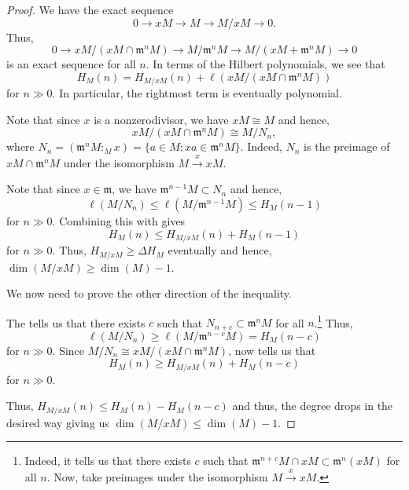 \documentclass[12pt]{article}
\begin{document}
\begin{proof} 
	We have the exact sequence
	\begin{equation*} 
		0 \to xM \to M \to M/xM \to 0.
	\end{equation*}
	Thus,
	\begin{equation*} 
		0 \to xM/(xM \cap \mathfrak{m}^{n} M) \to M/\mathfrak{m}^{n} M \to M/(xM + \mathfrak{m}^{n} M) \to 0
	\end{equation*}
	is an exact sequence for all $n$. In terms of the Hilbert polynomials, we see that
	\begin{equation} \label{eq:006}
		H_{M}(n) = H_{M/xM}(n) + \ell(xM/(xM \cap \mathfrak{m}^{n} M))
	\end{equation}
	for $n \gg 0$. In particular, the rightmost term is eventually polynomial. 

	Note that since $x$ is a nonzerodivisor, we have $xM \cong M$ and hence,
	\begin{equation*} 
		xM/(xM \cap \mathfrak{m}^{n} M) \cong M/N_{n},
	\end{equation*}
	where $N_{n} = (\mathfrak{m}^{n}M :_{M} x) = \{a \in M : xa \in \mathfrak{m}^{n} M\}$. Indeed, $N_{n}$ is the preimage of $xM \cap \mathfrak{m}^{n} M$ under the isomorphism $M \xrightarrow{x} xM$.

	Note that since $x \in \mathfrak{m}$, we have $\mathfrak{m}^{n - 1} M \subset N_{n}$ and hence, 
	\begin{equation*} 
		\ell(M/N_{n}) \le \ell(M/\mathfrak{m}^{n - 1} M) \le H_{M}(n - 1)
	\end{equation*}
	for $n \gg 0$. Combining this with  gives
	\begin{equation*} 
		H_{M}(n) \le H_{M/xM}(n) + H_{M}(n - 1)
	\end{equation*}
	for $n \gg 0$. Thus, $H_{M/xM} \ge \Delta H_{M}$ eventually and hence, $\dim(M/xM) \ge \dim(M) - 1$.

	We now need to prove the other direction of the inequality. 

	The  tells us that there exists $c$ such that $N_{n + c} \subset \mathfrak{m}^{n} M$ for all $n$.\footnote{Indeed, it tells us that there exists $c$ such that $\mathfrak{m}^{n + c} M \cap xM \subset \mathfrak{m}^{n} (xM)$ for all $n$. Now, take preimages under the isomorphism $M \xrightarrow{x} xM$.} Thus,
	\begin{equation*} 
		\ell(M/N_{n}) \ge \ell(M/\mathfrak{m}^{n - c} M) = H_{M}(n - c)
	\end{equation*}
	for $n \gg 0$. Since $M/N_{n} \cong xM/(xM \cap \mathfrak{m}^{n} M)$,  now tells us that
	\begin{equation*} 
		H_{M}(n) \ge H_{M/xM}(n) + H_{M}(n - c)
	\end{equation*}
	for $n \gg 0$.

	Thus, $H_{M/xM}(n) \le H_{M}(n) - H_{M}(n - c)$ and thus, the degree drops in the desired way giving us $\dim(M/xM) \le \dim(M) - 1$.
\end{proof}
\end{document}
